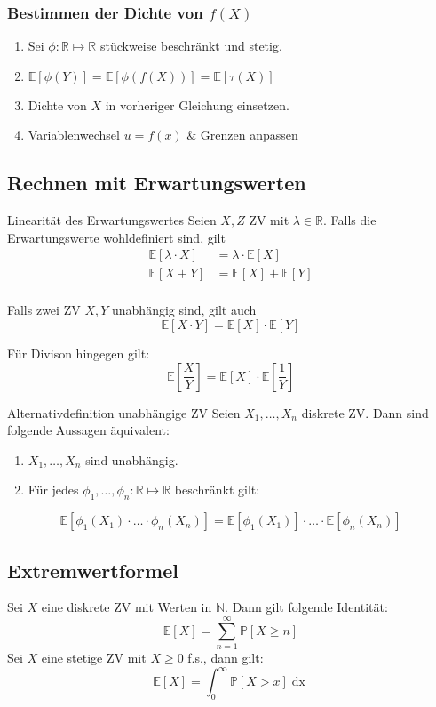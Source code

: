 \documentclass[a4paper,10pt]{article}
\def\R{\mathbb{R}}
\def\P{\mathbb{P}}
\def\E{\mathbb{E}}
\begin{document}
\subsubsection{\texorpdfstring{Bestimmen der Dichte von \(f(X)\)}{Bestimmen der Dichte von f(X)}}
\begin{enumerate}
	\item Sei \(\phi: \R \mapsto \R\) stückweise beschränkt und stetig.
	\item \(\E[\phi(Y)] = \E[\phi(f(X))] = \E[\tau(X)]\)
	\item Dichte von \(X\) in vorheriger Gleichung einsetzen.
	\item Variablenwechsel \(u = f(x)\) \& Grenzen anpassen
\end{enumerate}

\subsection{Rechnen mit Erwartungswerten}
\begin{subbox}{Linearität des Erwartungswertes}
	Seien \(X,Z\) ZV mit \(\lambda \in \R\). Falls die Erwartungswerte wohldefiniert sind, gilt
	\begin{align*}
		\E[\lambda \cdot X] & = \lambda \cdot \E[X] \\
		\E[X + Y]           & = \E[X] + \E[Y]       \\
	\end{align*}
\end{subbox}
Falls zwei ZV \(X,Y\) unabhängig sind, gilt auch
\[\E[X\cdot Y] = \E[X] \cdot \E[Y]\]

Für Divison hingegen gilt:
\[\E[\frac{X}{Y}] = \E[X] \cdot \E[\frac{1}{Y}]\]

\begin{subbox}{Alternativdefinition unabhängige ZV}
	Seien \(X_1, \ldots, X_n\) diskrete ZV. Dann sind folgende Aussagen äquivalent:
	\begin{enumerate}
		\item \(X_1, \ldots, X_n\) sind unabhängig.
		\item Für jedes \(\phi_1, \ldots, \phi_n: \R \mapsto\R\) beschränkt gilt:
	\end{enumerate}
	\[\E[\phi_1(X_1)\cdot\ldots\cdot\phi_n(X_n)] = \E[\phi_1(X_1)] \cdot\ldots\cdot \E[\phi_n(X_n)]\]
\end{subbox}

\subsection{Extremwertformel}
Sei \(X\) eine diskrete ZV mit Werten in \(\mathbb{N}\). Dann gilt folgende Identität:
\[\E[X] = \sum_{n=1}^\infty \P[X\ge n]\]
Sei \(X\) eine stetige ZV mit \(X \ge 0\) f.s., dann gilt:
\[\E[X] = \int_0^\infty \P[X > x] \mathop{dx}\]
\end{document}
